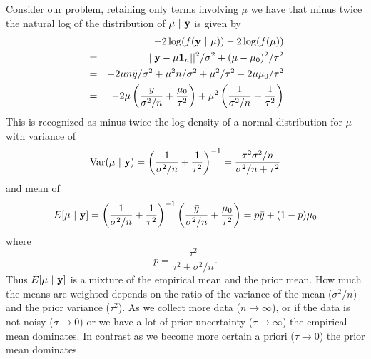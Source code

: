 Consider our problem, retaining only terms involving $\mu$ we have that minus twice the natural log of the
distribution of  $\mu ~|~ \mathbf{y}$ is given by
\begin{eqnarray*}
&   & -2 \log(f(\mathbf{y} ~|~ \mu)) - 2 \log(f(\mu)) \\
& = & ||\mathbf{y} - \mu \mathbf{1}_n||^2 / \sigma^2  + (\mu - \mu_0)^2 / \tau^2 \\
& = & -2 \mu n \bar y / \sigma^2 + \mu^2 n / \sigma^2 + \mu^2 / \tau^2 - 2 \mu \mu_0 / \tau^2 \\
& = & -2 \mu \left(
\frac{\bar y}{\sigma^2 / n} + \frac{\mu_0}{\tau^2}\right)
+ \mu^2 \left(
\frac{1}{\sigma^2 / n} + \frac{1}{\tau^2}
\right)
\end{eqnarray*}
This is recognized as minus twice the log density of a normal distribution for $\mu$ with variance
of 
$$
\mbox{Var}(\mu ~|~ \mathbf{y}) =
\left(
\frac{1}{\sigma^2 / n} + \frac{1}{\tau^2}
\right)^{-1}
=\frac{\tau^2 \sigma^2 / n}{\sigma^2 / n + \tau^2}
$$
and mean of
$$
E[\mu ~|~ \mathbf{y}] = \left(
\frac{1}{\sigma^2 / n} + \frac{1}{\tau^2}
\right)^{-1}
\left(
\frac{\bar y}{\sigma^2 / n} + \frac{\mu_0}{\tau^2}\right)
= p \bar y + (1 - p) \mu_0
$$
where 
$$
p = \frac{\tau^2}{\tau^2 + \sigma^2 /n }.
$$
Thus $E[\mu ~|~ \mathbf{y}]$ is a mixture of the empirical mean and the prior mean. How much 
the means are weighted depends on the ratio of the variance of the mean ($\sigma^2/n$)
and the prior variance ($\tau^2$). As we collect more data ($n \rightarrow \infty$), or if the
data is not noisy
($\sigma \rightarrow 0$) or we have a lot of prior uncertainty ($\tau \rightarrow \infty$) the empirical mean dominates. In contrast as we become more certain a priori
($\tau \rightarrow 0$) the prior mean dominates.

